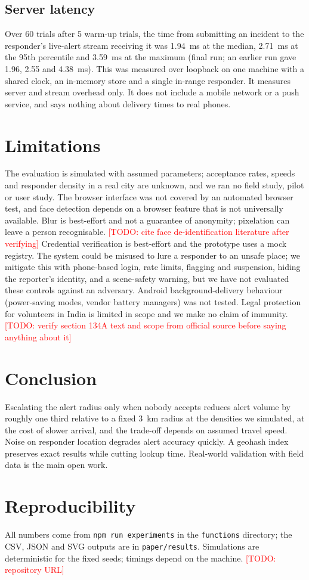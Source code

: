 \documentclass[conference]{IEEEtran}
\newcommand{\todo}[1]{\textcolor{red}{[TODO: #1]}}
\begin{document}
\subsection{Server latency}
Over 60 trials after 5 warm-up trials, the time from submitting an incident to the responder's live-alert stream receiving it was 1.94~ms at the median, 2.71~ms at the 95th percentile and 3.59~ms at the maximum (final run; an earlier run gave 1.96, 2.55 and 4.38~ms). This was measured over loopback on one machine with a shared clock, an in-memory store and a single in-range responder. It measures server and stream overhead only. It does not include a mobile network or a push service, and says nothing about delivery times to real phones.

\section{Limitations}
The evaluation is simulated with assumed parameters; acceptance rates, speeds and responder density in a real city are unknown, and we ran no field study, pilot or user study. The browser interface was not covered by an automated browser test, and face detection depends on a browser feature that is not universally available. Blur is best-effort and not a guarantee of anonymity; pixelation can leave a person recognisable. \todo{cite face de-identification literature after verifying} Credential verification is best-effort and the prototype uses a mock registry. The system could be misused to lure a responder to an unsafe place; we mitigate this with phone-based login, rate limits, flagging and suspension, hiding the reporter's identity, and a scene-safety warning, but we have not evaluated these controls against an adversary. Android background-delivery behaviour (power-saving modes, vendor battery managers) was not tested. Legal protection for volunteers in India is limited in scope and we make no claim of immunity. \todo{verify section 134A text and scope from official source before saying anything about it}

\section{Conclusion}
Escalating the alert radius only when nobody accepts reduces alert volume by roughly one third relative to a fixed 3~km radius at the densities we simulated, at the cost of slower arrival, and the trade-off depends on assumed travel speed. Noise on responder location degrades alert accuracy quickly. A geohash index preserves exact results while cutting lookup time. Real-world validation with field data is the main open work.

\section*{Reproducibility}
All numbers come from \texttt{npm run experiments} in the \texttt{functions} directory; the CSV, JSON and SVG outputs are in \texttt{paper/results}. Simulations are deterministic for the fixed seeds; timings depend on the machine. \todo{repository URL}



\end{document}
